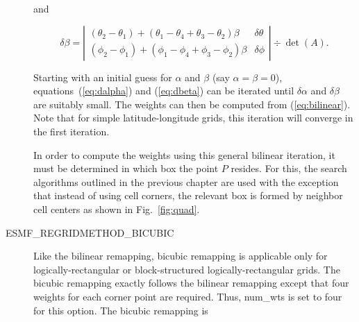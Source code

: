 \begin{description}
     and

\begin{equation}\label{eq:dbeta}
\delta\beta
= \left|\begin{array}{cc}
(\theta_2-\theta_1) + (\theta_1-\theta_4+\theta_3-\theta_2)\beta &
\delta\theta \\
(\phi_2-\phi_1) + (\phi_1-\phi_4+\phi_3-\phi_2)\beta &
\delta\phi 
\end{array}\right| \div \det(A).
\end{equation}

     Starting with an initial guess for $\alpha$ and $\beta$ (say 
     $\alpha=\beta=0$), equations~(\ref{eq:dalpha}) and (\ref{eq:dbeta})
     can be iterated until $\delta\alpha$ and $\delta\beta$ are suitably small.
     The weights can then be computed from (\ref{eq:bilinear}).  Note that
     for simple latitude-longitude grids, this iteration will converge in the
     first iteration.

     In order to compute the weights using this general bilinear iteration,
     it must be determined in which box the point $P$ resides.  For this,
     the search algorithms outlined in the previous chapter are used with
     the exception that instead of using cell corners, the relevant box is
     formed by neighbor cell centers as shown in Fig.~\ref{fig:quad}.

\item[ESMF\_REGRIDMETHOD\_BICUBIC ]

     Like the bilinear remapping, bicubic remapping is applicable
     only for logically-rectangular or block-structured logically-rectangular
     grids.  The bicubic remapping exactly follows the bilinear remapping except
     that four weights for each corner point are required.  Thus, num\_wts
     is set to four for this option.  The bicubic remapping is


\end{description}
